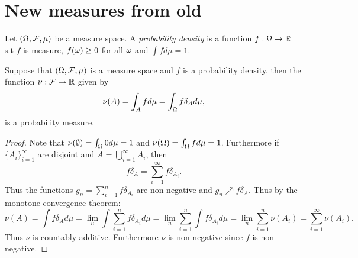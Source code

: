 \section{New measures from old}
\begin{defn}
    Let $({{\Omega}},{\mathcal{F}},\mu)$ be a measure space. A \emph{probability density} is a function $f: {{\Omega}} \to {\mathbb R}$ s.t $f$ is measure, $f({\omega}) \ge 0$ for all ${\omega}$ and $\int fd\mu = 1$. 
\end{defn}
\begin{prop}
    Suppose that $({{\Omega}},{\mathcal{F}},\mu)$ is a measure space and $f$ is a probability density, then the function $\nu : {\mathcal{F}} \to {\mathbb R}$ given by
    \[\nu(A) = \int_A f d\mu = \int_{{\Omega}} f\delta_A d\mu, \]
    is a probability measure.
\end{prop}
\begin{proof}
    Note that $\nu(\emptyset) = \int_{{\Omega}} 0 d\mu = 1$ and $\nu({{\Omega}}) = \int_{{\Omega}} f d\mu = 1$. Furthermore if $\{A_i\}_{i=1}^\infty$ are disjoint and $A = \bigcup_{i=1}^\infty A_i$, then 
    \[f\delta_A =\sum_{i=1}^\infty f\delta_{A_i}.  \]
    Thus the functions $g_n = \sum_{i=1}^n f\delta_{A_i}$ are non-negative and $g_n \nearrow f\delta_A$. Thus by the monotone convergence theorem:
    \[\nu(A) = \int f \delta_A d\mu = \lim_{n} \int \sum_{i=1}^n f\delta_{A_i}d\mu =\lim_n \sum_{i=1}^n \int f\delta_{A_i}d\mu = \lim_n \sum_{i=1}^n \nu(A_i) =\sum_{i=1}^\infty \nu(A_i). \]
    Thus $\nu$ is countably additive. Furthermore $\nu$ is non-negative since $f$ is non-negative.
\end{proof}
